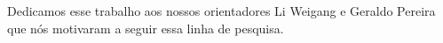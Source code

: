 Dedicamos esse trabalho aos nossos orientadores Li Weigang e Geraldo Pereira que nós motivaram a seguir essa linha de pesquisa.
